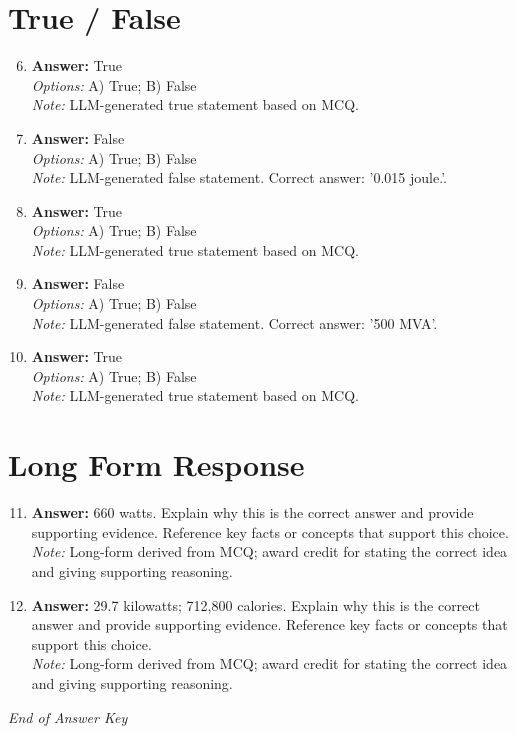 \documentclass[12pt]{article}
\begin{document}
\section*{True / False}
\begin{enumerate}[label=\arabic*.]
\setcounter{enumi}{5}
\item \textbf{Answer:} True
\\ \textit{Options:} A) True; B) False
\\ \textit{Note:} LLM-generated true statement based on MCQ.
\item \textbf{Answer:} False
\\ \textit{Options:} A) True; B) False
\\ \textit{Note:} LLM-generated false statement. Correct answer: '0.015 joule.'.
\item \textbf{Answer:} True
\\ \textit{Options:} A) True; B) False
\\ \textit{Note:} LLM-generated true statement based on MCQ.
\item \textbf{Answer:} False
\\ \textit{Options:} A) True; B) False
\\ \textit{Note:} LLM-generated false statement. Correct answer: '500 MVA'.
\item \textbf{Answer:} True
\\ \textit{Options:} A) True; B) False
\\ \textit{Note:} LLM-generated true statement based on MCQ.
\end{enumerate}

\section*{Long Form Response}
\begin{enumerate}[label=\arabic*.]
\setcounter{enumi}{10}
\item \textbf{Answer:} 660 watts. Explain why this is the correct answer and provide supporting evidence. Reference key facts or concepts that support this choice.
\\ \textit{Note:} Long-form derived from MCQ; award credit for stating the correct idea and giving supporting reasoning.
\item \textbf{Answer:} 29.7 kilowatts; 712,800 calories. Explain why this is the correct answer and provide supporting evidence. Reference key facts or concepts that support this choice.
\\ \textit{Note:} Long-form derived from MCQ; award credit for stating the correct idea and giving supporting reasoning.
\end{enumerate}

\vfill
\noindent\textit{End of Answer Key}
\end{document}
